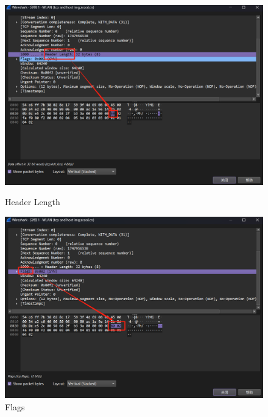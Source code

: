 \documentclass{article}
\begin{document}
	\begin{figure}[H]
		\centering
		\begin{minipage}[b]{0.45\textwidth}
			\includegraphics[width=\textwidth]{images/9.Header Length.png}
			\caption{Header Length}
		\end{minipage}
		\hfill
		\begin{minipage}[b]{0.45\textwidth}
			\includegraphics[width=\textwidth]{images/10.Flags.png}
			\caption{Flags}
		\end{minipage}
	\end{figure}
	
\end{document}
